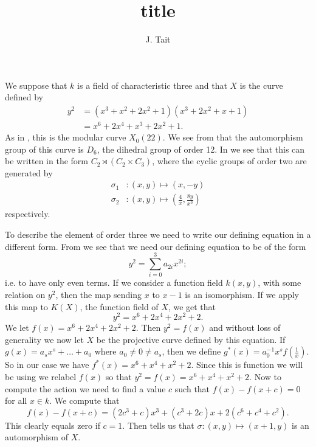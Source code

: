 \documentclass[draft, 11pt]{article} %
\title{title}
\author{J. Tait}
\theoremstyle{plain}
\theoremstyle{remark}
\begin{document}
\maketitle

We suppose that $k$ is a field of characteristic three and that $X$ is the curve defined by
\begin{align*}
y^2  & = (x^3 + x^2 + 2x^2 + 1)(x^3 + 2x^2 + x + 1)\\
& = x^6 + 2x^4 + x^3 + 2x^2 + 1.
\end{align*}
As in \cite[Table 2]{automorphismshyperellipticmodular}, this is the modular curve $X_0(22)$.
We see from \cite[Table 1]{automorphismshyperellipticmodular} that the automorphism group of this curve is $D_6$, the dihedral group of order 12.
In \cite[\S 3.3]{automorphismshyperellipticmodular} we see that this can be written in the form $C_2 \rtimes (C_2 \times C_3)$, where the cyclic groups of order two are generated by
\begin{align*}
\sigma_1 & \colon (x,y) \mapsto (x,-y) \\
\sigma_2 & \colon (x,y) \mapsto \left( \frac{4}{x}, \frac{8y}{x^3} \right)
\end{align*}
respectively.

To describe the element of order three we need to write our defining equation in a different form.
From \cite[\S 3.3]{automorphismshyperellipticmodular} we see that we need our defining equation to be of the form 
\[
y^2 = \sum_{i=0}^3 a_{2i}x^{2i};
\]
i.e. to have only even terms.
If we consider a function field $k(x,y)$, with some relation on $y^2$, then the map sending $x$ to $x-1$ is an isomorphism.
If we apply this map to $K(X)$, the function field of $X$, we get that
\[
y^2 = x^6 + 2x^4 + 2x^2 + 2.
\]
We let $f(x) = x^6 + 2x^4 + 2x^2 + 2$.
Then $y^2 = f(x)$ and without loss of generality we now let $X$ be the projective curve defined by this equation.
If $g(x) = a_sx^s + \ldots + a_0$ where $a_0 \neq 0 \neq a_s$, then we define $g^*(x) = a_0^{-1}x^sf\left( \frac{1}{x} \right)$.
So in our case we have $f^*(x) = x^6  + x^4 + x^2 + 2$.
Since this is function we will be using we relabel $f(x)$ so that $y^2 = f(x) = x^6 + x^4 + x^2 + 2$.
Now to compute the action we need to find a value $c$ such that $f(x) - f(x+c) = 0$ for all $x \in k$.
We compute that
\[
f(x) - f(x+c) = (2c^3+c)x^3 + (c^3 + 2c)x + 2(c^6 + c^4 + c^2).
\]
This clearly equals zero if $c=1$.
Then \cite[\S 3.3]{automorphismshyperellipticmodular} tells us that $\sigma \colon (x,y) \mapsto (x+1, y)$ is an automorphism of $X$.
\end{document}
